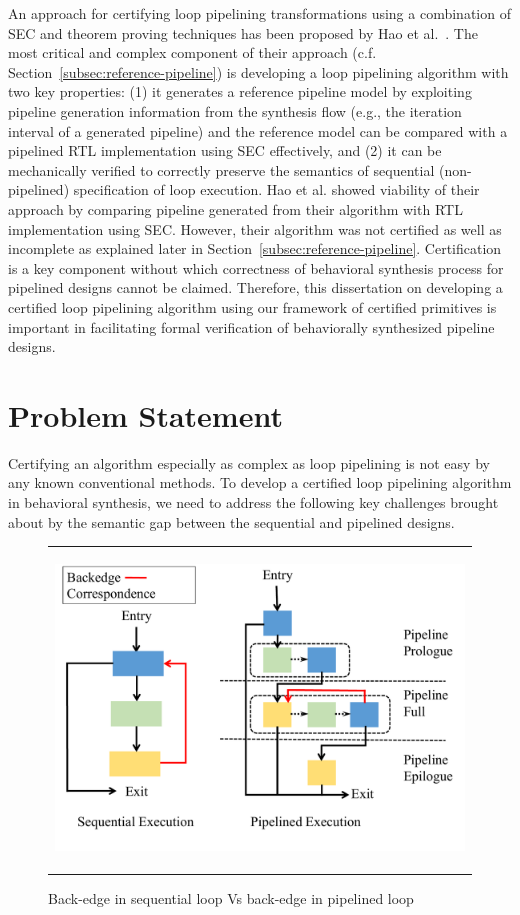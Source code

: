 An approach for certifying loop pipelining transformations using a combination of SEC and 
theorem proving techniques has been proposed by Hao et al.~\cite{hrx:dac-12}. The most critical and complex
component of their approach (c.f. Section~\ref{subsec:reference-pipeline}) is developing
a loop pipelining algorithm with two key properties: (1) it generates a reference pipeline model 
by exploiting pipeline generation information from the synthesis flow (e.g., the iteration interval 
of a generated pipeline) and the reference model can be compared with a pipelined RTL 
implementation using SEC effectively, and (2) it can be mechanically verified to correctly preserve the semantics of
sequential (non-pipelined) specification of loop execution. Hao et al. showed viability of 
their approach by comparing pipeline generated from their algorithm with RTL implementation 
using SEC. However, their algorithm was not certified as well as incomplete as explained 
later in Section~\ref{subsec:reference-pipeline}. Certification is a key component 
without which correctness of behavioral synthesis process for pipelined designs cannot be claimed.
Therefore, this dissertation on 
developing a certified loop pipelining algorithm using our framework of certified 
primitives is important in facilitating formal verification of behaviorally synthesized
 pipeline designs.

\section{Problem Statement}
Certifying an algorithm especially as complex as loop pipelining is not easy by any known conventional methods. To develop a certified loop pipelining algorithm in behavioral synthesis, we need to address the following key challenges brought about by the semantic gap between the sequential and pipelined designs.

\begin{figure}[t!]
\begin{center}
\begin{tabular}{c}
\includegraphics[height=3.3in]{fig-proposal/seq-and-pp}
\end{tabular}
\end{center}
\caption{Back-edge in sequential loop Vs back-edge in pipelined loop}
\label{fig:seq-and-pp}
\end{figure}

